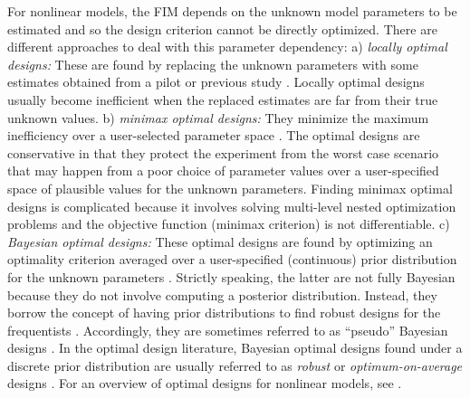 For nonlinear models, the FIM  depends on the unknown model parameters to be estimated and so the design criterion cannot be directly optimized.  There are
different approaches   to deal with this parameter dependency: a) {\it locally optimal designs:} These are   found by replacing the  unknown parameters with some estimates obtained from a pilot or previous study \citep{chernoff1953}.
Locally optimal  designs usually become inefficient when the replaced estimates  are far  from their true unknown values.
b) {\it minimax optimal designs:} They minimize the maximum inefficiency over a user-selected  parameter space \citep{sitter1992}. The optimal designs are conservative in   that they protect the experiment from the worst case scenario that may happen from a poor choice of parameter values over  a user-specified space of plausible values for the unknown parameters.  Finding minimax optimal  designs is  complicated  because it involves solving  multi-level nested optimization problems  and the objective function (minimax criterion) is not differentiable. c) {\it Bayesian optimal designs:}  These optimal designs
are found by optimizing an  optimality criterion averaged over a user-specified (continuous) prior distribution for the unknown parameters  \citep{chaloner1989, chaloner1995, Atkinson1996}.
Strictly speaking, the latter are not fully Bayesian because they do not involve computing a posterior distribution.
Instead, they borrow the concept of having prior distributions to find robust designs for the frequentists \citep{grasshoff2012optimal, burkner2019optimal}. Accordingly,  they are  sometimes referred to as ``pseudo'' Bayesian  designs \citep{firth1997bayesian}.  In the optimal design literature,  Bayesian optimal designs found under a discrete prior distribution    are  usually referred to as {\it robust } or {\it optimum-on-average} designs  \citep{fedorov2012model}.
For an overview of optimal designs for nonlinear models, see \citet{fedorov2013optimal}.

